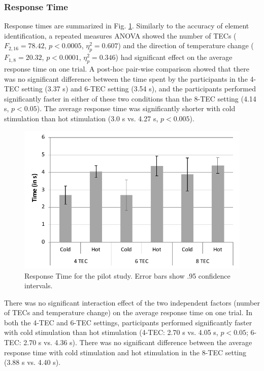 \documentclass[preprint,12pt]{elsarticle}
\begin{document}
\subsubsection{Response Time}
Response times are summarized in Fig. \ref{fig:8}. Similarly to the accuracy of element identification, a repeated measures ANOVA showed the number of TECs ($F_{2,16} = 78.42$, $p < 0.0005$, $\eta_p^2 = 0.607$) and the direction of temperature change ($F_{1,8} = 20.32$, $p < 0.0001$, $\eta_p^2 = 0.346$) had significant effect on the average response time on one trial.
A post-hoc pair-wise comparison showed that there was no significant difference between the time spent by the participants in the 4-TEC setting (3.37 s) and 6-TEC setting (3.54 s), and the participants performed significantly faster in either of these two conditions than the 8-TEC setting (4.14 s, $p < 0.05$).
The average response time was significantly shorter with cold stimulation than hot stimulation (3.0 s vs. 4.27 s, $p < 0.005$).

\begin{figure}[tp]
  \centering
  \includegraphics[width=0.7\columnwidth]{img/fig8.pdf}
  \caption{Response Time for the pilot study. Error bars show .95 confidence intervals.}
  \label{fig:8}
\end{figure}

There was no significant interaction effect of the two independent factors (number of TECs and temperature change) on the average response time on one trial.
In both the 4-TEC and 6-TEC settings, participants performed significantly faster with cold stimulation than hot stimulation (4-TEC: 2.70 s vs. 4.05 s, $p < 0.05$; 6-TEC: 2.70 s vs. 4.36 s). There was no significant difference between the average response time with cold stimulation and hot stimulation in the 8-TEC setting (3.88 s vs. 4.40 s).
\end{document}
